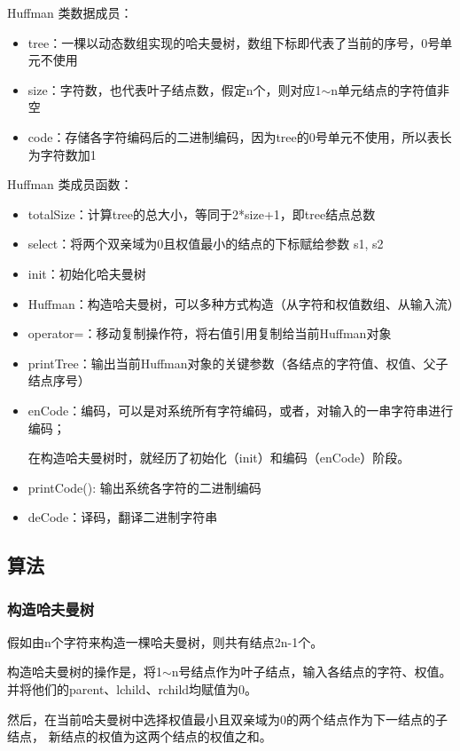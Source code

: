 \documentclass{ctexart}
\begin{document}
    Huffman 类数据成员：
    \begin{itemize}
        \item tree：一棵以动态数组实现的哈夫曼树，数组下标即代表了当前的序号，0号单元不使用
        \item size：字符数，也代表叶子结点数，假定n个，则对应1$\sim$n单元结点的字符值非空
        \item code：存储各字符编码后的二进制编码，因为tree的0号单元不使用，所以表长为字符数加1
    \end{itemize}

    Huffman 类成员函数：
    \begin{itemize}
        \item totalSize：计算tree的总大小，等同于2*size+1，即tree结点总数
        \item select：将两个双亲域为0且权值最小的结点的下标赋给参数 s1, s2
        \item init：初始化哈夫曼树
        \item Huffman：构造哈夫曼树，可以多种方式构造（从字符和权值数组、从输入流）
        \item operator=：移动复制操作符，将右值引用复制给当前Huffman对象
        \item printTree：输出当前Huffman对象的关键参数（各结点的字符值、权值、父子结点序号）
        \item enCode：编码，可以是对系统所有字符编码，或者，对输入的一串字符串进行编码；
        \par 在构造哈夫曼树时，就经历了初始化（init）和编码（enCode）阶段。
        \item printCode(): 输出系统各字符的二进制编码
        \item deCode：译码，翻译二进制字符串
    \end{itemize}

    \subsection{算法}
    \subsubsection{构造哈夫曼树}
    假如由n个字符来构造一棵哈夫曼树，则共有结点2n-1个。
    
    构造哈夫曼树的操作是，将1$\sim$n号结点作为叶子结点，输入各结点的字符、权值。
    并将他们的parent、lchild、rchild均赋值为0。

    然后，在当前哈夫曼树中选择权值最小且双亲域为0的两个结点作为下一结点的子结点，
    新结点的权值为这两个结点的权值之和。
\end{document}
